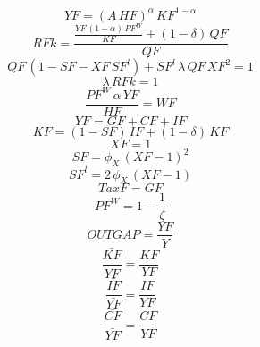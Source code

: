 \begin{dmath}
{YF}=\left({A}\, {HF}\right)^{{{\alpha}}}\, {KF}^{1-{{\alpha}}}
\end{dmath}
\begin{dmath}
{RFk}=\frac{\frac{{YF}\, \left(1-{{\alpha}}\right)\, {PF^{W}}}{{KF}}+\left(1-{{\delta}}\right)\, {QF}}{{QF}}
\end{dmath}
\begin{dmath}
{QF}\, \left(1-{SF}-{XF}\, {SF^{l}}\right)+{SF^{l}}\, {\lambda}\, {QF}\, {XF}^{2}=1
\end{dmath}
\begin{dmath}
{\lambda}\, {RFk}=1
\end{dmath}
\begin{dmath}
\frac{{PF^{W}}\, {{\alpha}}\, {YF}}{{HF}}={WF}
\end{dmath}
\begin{dmath}
{YF}={GF}+{CF}+{IF}
\end{dmath}
\begin{dmath}
{KF}=\left(1-{SF}\right)\, {IF}+\left(1-{{\delta}}\right)\, {KF}
\end{dmath}
\begin{dmath}
{XF}=1
\end{dmath}
\begin{dmath}
{SF}={{\phi_{X}}}\, \left({XF}-1\right)^{2}
\end{dmath}
\begin{dmath}
{SF^{l}}=2\, {{\phi_{X}}}\, \left({XF}-1\right)
\end{dmath}
\begin{dmath}
{TaxF}={GF}
\end{dmath}
\begin{dmath}
{PF^{W}}=1-\frac{1}{{{\zeta}}}
\end{dmath}
\begin{dmath}
{OUTGAP}=\frac{{YF}}{{Y}}
\end{dmath}
\begin{dmath}
{\frac{\bar{KF}}{\bar{YF}}}=\frac{{KF}}{{YF}}
\end{dmath}
\begin{dmath}
{\frac{\bar{IF}}{\bar{YF}}}=\frac{{IF}}{{YF}}
\end{dmath}
\begin{dmath}
{\frac{\bar{CF}}{\bar{YF}}}=\frac{{CF}}{{YF}}
\end{dmath}
